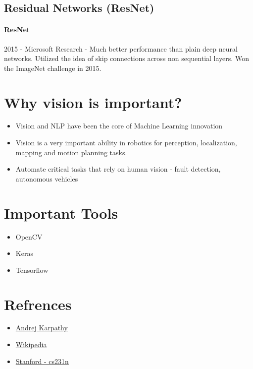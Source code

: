 \documentclass{article}
\begin{document}
	\subsection{Residual Networks (ResNet)}
		\paragraph{ResNet}
		2015 - Microsoft Research - Much better performance than plain deep neural networks. Utilized the idea of skip connections across non sequential layers. Won the ImageNet challenge in 2015.

	\section{Why vision is important?}
	\begin{itemize}
		\item Vision and NLP have been the core of Machine Learning innovation
		\item Vision is a very important ability in robotics for perception, localization, mapping and motion planning tasks.
		\item Automate critical tasks that rely on human vision - fault detection, autonomous vehicles
	\end{itemize}

	\section{Important Tools}
	\begin{itemize}
		\item OpenCV
		\item Keras
		\item Tensorflow
	\end{itemize}
	
	\section{Refrences}
		\begin{itemize}
			\item \href{https://www.youtube.com/watch?v=u6aEYuemt0M\&t=524s}{Andrej Karpathy}
			\item \href{https://en.wikipedia.org/wiki/Computer_vision}{Wikipedia}
			\item \href{https://cs231n.github.io/}{Stanford - cs231n}
		\end{itemize}
\end{document}
